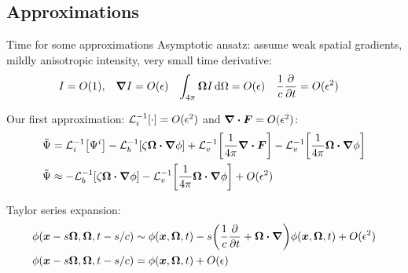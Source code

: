 \documentclass{beamer}
\begin{document}
\subsection{Approximations}
\begin{frame}{Time for some approximations}
  Asymptotic ansatz: assume weak spatial gradients, mildly anisotropic intensity, very small time
  derivative:
\begin{align*}
  I &= O(1), &
  \bm{\nabla} I &= O(\epsilon)&
  \int_{4\pi} \bm{\Omega} I\mathop{}\!\mathrm{d} \Omega &= O(\epsilon)&
  \frac{1}{c} \frac{\partial }{\partial t} &= O(\epsilon^2)
\end{align*}

Our first approximation: $\mathcal{L}_{i}^{-1}\!\left[\cdot\right] = O(\epsilon^2)$ and $\bm{\nabla} \bm{\cdot} \bm{F} =
O(\epsilon^2)$:
\begin{align*}
  \tilde \Psi &=
  \mathcal{L}_{i}^{-1}\!\left[\Psi^i\right]
  - \mathcal{L}_{b}^{-1}\!\left[\zeta\bm{\Omega}\bm{\cdot} \bm{\nabla} \phi\right]
  + \mathcal{L}_{v}^{-1}\!\left[\frac{1}{4\pi} \bm{\nabla} \bm{\cdot}\bm{F}\right] -
  \mathcal{L}_{v}^{-1}\!\left[\frac{1}{4\pi} \bm{\Omega}\bm{\cdot} \bm{\nabla} \phi\right]
    \\ 
  \tilde \Psi 
  &\approx -\mathcal{L}_{b}^{-1}\!\left[\zeta\bm{\Omega}\bm{\cdot} \bm{\nabla} \phi\right]
  - \mathcal{L}_{v}^{-1}\!\left[\frac{1}{4\pi} \bm{\Omega}\bm{\cdot} \bm{\nabla} \phi\right]
  + O(\epsilon^2)
\end{align*}

Taylor series expansion:
\begin{align} \nonumber
  \phi(\bm{x} - s\bm{\Omega}, \bm{\Omega}, t - s/c)
  &\sim \phi(\bm{x}, \bm{\Omega}, t)
  - s \bigg( \frac{1}{c} \frac{\partial }{\partial t} + \bm{\Omega} \bm{\cdot} \bm{\nabla} \bigg)
  \phi(\bm{x}, \bm{\Omega}, t) + O(\epsilon^2)
\\ \label{eq:taylorPhi}
\phi(\bm{x} - s\bm{\Omega}, \bm{\Omega}, t - s/c)
&= \phi(\bm{x}, \bm{\Omega}, t) + O(\epsilon)
\end{align}
\end{frame}
\end{document}
